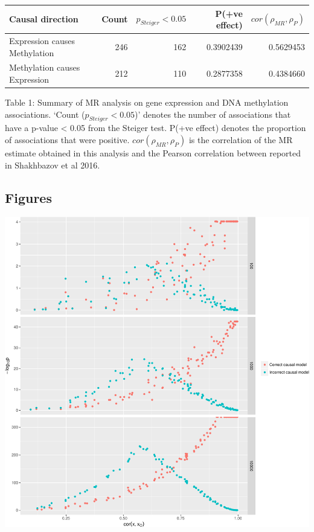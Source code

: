 \documentclass[]{article}
\begin{document}
\begin{longtable}[]{@{}lrrrr@{}}
\toprule
Causal direction & Count & \(p_{Steiger} < 0.05\) & P(+ve effect) &
\(cor(\rho_{MR}, \rho_{P})\)\tabularnewline
\midrule
\endhead
Expression causes Methylation & 246 & 162 & 0.3902439 &
0.5629453\tabularnewline
Methylation causes Expression & 212 & 110 & 0.2877358 &
0.4384660\tabularnewline
\bottomrule
\end{longtable}

Table 1: Summary of MR analysis on gene expression and DNA methylation
associations. `Count (\(p_{Steiger} < 0.05\))' denotes the number of
associations that have a p-value \textless{} 0.05 from the Steiger test.
P(+ve effect) denotes the proportion of associations that were positive.
\(cor(\rho_{MR}, \rho_{P})\) is the correlation of the MR estimate
obtained in this analysis and the Pearson correlation between reported
in Shakhbazov et al 2016.

\newpage

\subsection{Figures}\label{figures}

\includegraphics{manuscript_files/figure-latex/cit_measurement_error_figure-1.pdf}
\end{document}
